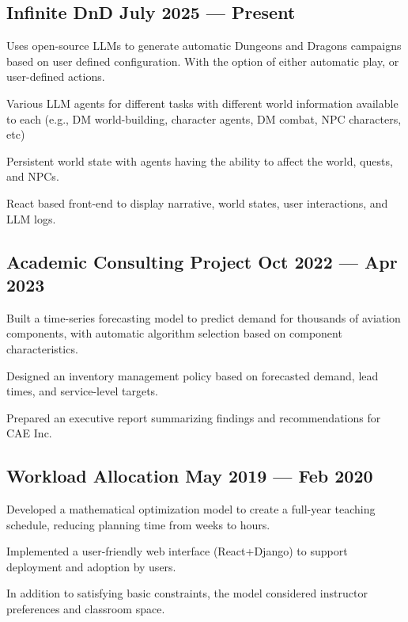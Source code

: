\subsection{{Infinite DnD \hfill July 2025 --- Present}}
\begin{zitemize}
    \setlength\itemsep{0.4em}
    \item Uses open-source LLMs to generate automatic Dungeons and Dragons campaigns based on user defined configuration. With the option of either automatic play, or user-defined actions.
    \item Various LLM agents for different tasks with different world information available to each (e.g., DM world-building, character agents, DM combat, NPC characters, etc) 
    \item Persistent world state with agents having the ability to affect the world, quests, and NPCs.
    \item React based front-end to display narrative, world states, user interactions, and LLM logs.
\end{zitemize}
\vspace{0.75em}

\subsection{{Academic Consulting Project \hfill Oct 2022 --- Apr 2023}}
\begin{zitemize}
    \setlength\itemsep{0.4em}
    \item Built a time-series forecasting model to predict demand for thousands of aviation components, with automatic algorithm selection based on component characteristics.
    \item Designed an inventory management policy based on forecasted demand, lead times, and service-level targets.
    \item Prepared an executive report summarizing findings and recommendations for CAE Inc.
\end{zitemize}
\vspace{0.75em}

\subsection{{Workload Allocation \hfill May 2019 --- Feb 2020}}
\begin{zitemize}
    \setlength\itemsep{0.4em}
    \item Developed a mathematical optimization model to create a full-year teaching schedule, reducing planning time from weeks to hours.
    \item Implemented a user-friendly web interface (React+Django) to support deployment and adoption by users.
    \item In addition to satisfying basic constraints, the model considered instructor preferences and classroom space.
\end{zitemize}
